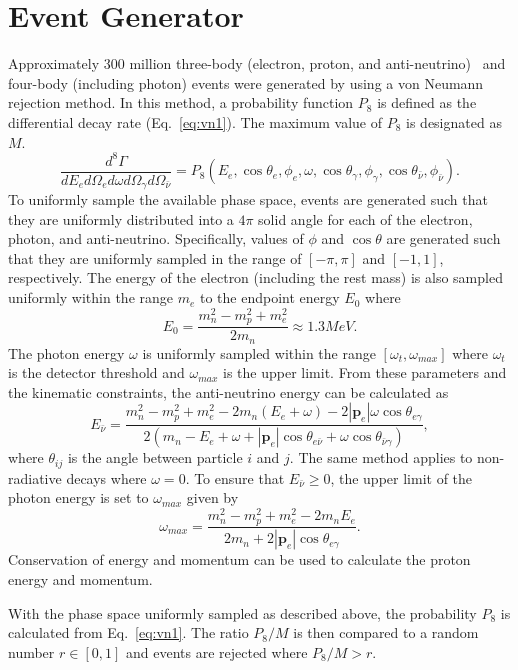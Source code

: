 \documentclass[oneside,12pt]{memoir}
\begin{document}
\section{Event Generator}
\label{sec:mcgen}
Approximately 300 million three-body (electron, proton, and anti-neutrino)~\cite{jackson57} and four-body (including photon) events were generated by using a von Neumann rejection method. In this method, a probability function $P_8$ is defined as the differential decay rate (Eq.~\ref{eq:vn1}). The maximum value of $P_8$ is designated as $M$.
\begin{equation}
	\label{eq:vn1}
	\frac{d^8\Gamma}{dE_e d\Omega_e d\omega d\Omega_{\gamma}
		d\Omega_{\bar{\nu}}}=P_8\left(E_e,\cos\theta_e,\phi_e,
		\omega,\cos\theta_\gamma,\phi_\gamma,\cos\theta_{\bar{\nu}}
		,\phi_{\bar{\nu}}\right).
\end{equation}
To uniformly sample the available phase space, events are generated such that they are uniformly distributed into a $4\pi$ solid angle for each of the electron, photon, and anti-neutrino. Specifically, values of $\phi$ and $\cos\theta$ are generated such that they are uniformly sampled in the range of $\left[-\pi,\pi\right]$ and $\left[-1,1\right]$, respectively. The energy of the electron (including the rest mass) is also sampled uniformly within the range $m_e$ to the endpoint energy $E_0$ where
\begin{equation}
	\label{eq:vn2}
	E_0=\frac{m_n^2-m_p^2+m_e^2}{2m_n}\approx 1.3 MeV.
\end{equation}
The photon energy $\omega$ is uniformly sampled within the range $\left[\omega_t,\omega_{max}\right]$ where $\omega_t$ is the detector threshold and $\omega_{max}$ is the upper limit. From these parameters and the kinematic constraints, the anti-neutrino energy can be calculated as
\begin{equation}
	\label{eq:vn3}
	E_{\bar{\nu}}=\frac{m_n^2-m_p^2+m_e^2
		-2m_n\left(E_e+\omega\right)-2\left|\mathbf{p}_e\right|
		\omega\cos\theta_{e\gamma}}{2\left(m_n-E_e+\omega
		+\left|\mathbf{p}_e\right|\cos\theta_{e\bar{\nu}}
		+\omega\cos\theta_{\bar{\nu}\gamma}\right)},
\end{equation}
where $\theta_{ij}$ is the angle between particle $i$ and $j$. The same method applies to non-radiative decays where $\omega = 0$. To ensure that $E_{\bar{\nu}}\geq 0$, the upper limit of the photon energy is set to $\omega_{max}$ given by
\begin{equation}
	\label{eq:vn4}
	\omega_{max}=\frac{m_n^2-m_p^2+m_e^2-2m_n E_e}
		{2m_n+2\left|\mathbf{p}_e\right|\cos\theta_{e\gamma}}.
\end{equation}
Conservation of energy and momentum can be used to calculate the proton energy and momentum.\par
With the phase space uniformly sampled as described above, the probability $P_8$ is calculated from Eq.~\ref{eq:vn1}. The ratio $P_8/M$ is then compared to a random number $r\in\left[0,1\right]$ and events are rejected where $P_8/M>r$.\par
\end{document}
